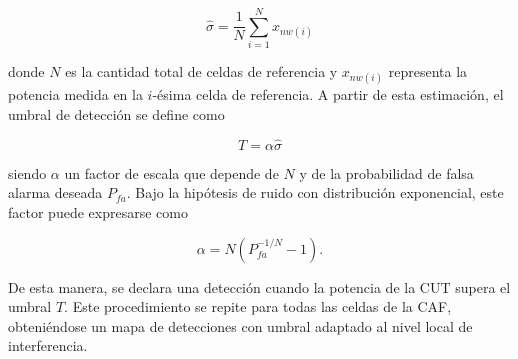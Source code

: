\begin{equation}
    \hat{\sigma} = \frac{1}{N}\sum_{i=1}^{N} x_{nw(i)}
\end{equation}

donde \(N\) es la cantidad total de celdas de referencia y \(x_{nw(i)}\) representa la potencia medida en la \(i\)-ésima celda de referencia. A partir de esta estimación, el umbral de detección se define como

\begin{equation}
    T = \alpha \hat{\sigma}
\end{equation}

siendo \(\alpha\) un factor de escala que depende de \(N\) y de la probabilidad de falsa alarma deseada \(P_{fa}\). Bajo la hipótesis de ruido con distribución exponencial, este factor puede expresarse como

\begin{equation}
    \alpha = N\left(P_{fa}^{-1/N} - 1\right).
\end{equation}

De esta manera, se declara una detección cuando la potencia de la CUT supera el umbral \(T\). Este procedimiento se repite para todas las celdas de la CAF, obteniéndose un mapa de detecciones con umbral adaptado al nivel local de interferencia.
